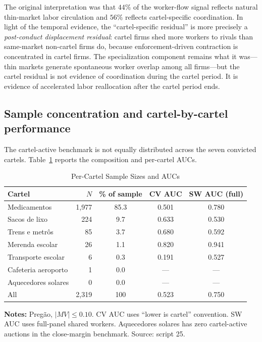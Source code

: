 The original interpretation was that $44\%$ of the worker-flow signal reflects natural thin-market labor circulation and $56\%$ reflects cartel-specific coordination. In light of the temporal evidence, the ``cartel-specific residual'' is more precisely a \emph{post-conduct displacement residual}: cartel firms shed more workers to rivals than same-market non-cartel firms do, because enforcement-driven contraction is concentrated in cartel firms. The specialization component remains what it was---thin markets generate spontaneous worker overlap among all firms---but the cartel residual is not evidence of coordination during the cartel period. It is evidence of accelerated labor reallocation after the cartel period ends.

\subsection{Sample concentration and cartel-by-cartel performance}\label{sec:concentration}

The cartel-active benchmark is not equally distributed across the seven convicted cartels. Table~\ref{tab:cartel_by_cartel} reports the composition and per-cartel AUCs.

\begin{table}[htbp]
\centering
\caption{Per-Cartel Sample Sizes and AUCs}\label{tab:cartel_by_cartel}
\begin{tabular}{lrccc}
\toprule
Cartel & $N$ & \% of sample & CV AUC & SW AUC (full) \\
\midrule
Medicamentos & 1{,}977 & 85.3 & 0.501 & 0.780 \\
Sacos de lixo & 224 & 9.7 & 0.633 & 0.530 \\
Trens e metr\^{o}s & 85 & 3.7 & 0.680 & 0.592 \\
Merenda escolar & 26 & 1.1 & 0.820 & 0.941 \\
Transporte escolar & 6 & 0.3 & 0.191 & 0.527 \\
Cafeteria aeroporto & 1 & 0.0 & --- & --- \\
Aquecedores solares & 0 & 0.0 & --- & --- \\
\midrule
All & 2{,}319 & 100 & 0.523 & 0.750 \\
\bottomrule
\end{tabular}
\vspace{0.5em}
\begin{minipage}{0.95\textwidth}
\scriptsize{\textbf{Notes:} Preg\~{a}o, $\lvert MV \rvert \le 0.10$. CV AUC uses ``lower is cartel'' convention. SW AUC uses full-panel shared workers. Aquecedores solares has zero cartel-active auctions in the close-margin benchmark. Source: script 25.\par}
\end{minipage}
\end{table}

